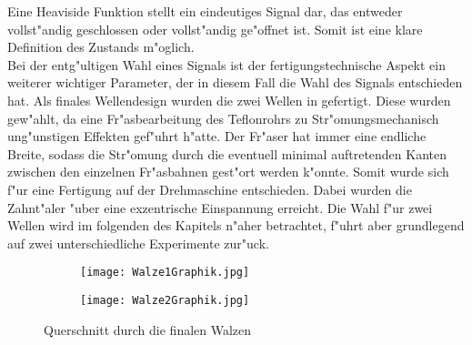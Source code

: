 Eine Heaviside Funktion stellt ein eindeutiges Signal dar, das entweder vollst"andig geschlossen oder vollst"andig ge"offnet ist. Somit ist eine klare Definition des Zustands m"oglich.\\
Bei der entg"ultigen Wahl eines Signals ist der fertigungstechnische Aspekt ein weiterer wichtiger Parameter, der in diesem Fall die Wahl des Signals entschieden hat. Als finales Wellendesign wurden die zwei Wellen in  gefertigt. Diese wurden gew"ahlt, da eine Fr"asbearbeitung des Teflonrohrs zu Str"omungsmechanisch ung"unstigen Effekten gef"uhrt h"atte. Der Fr"aser hat immer eine endliche Breite, sodass die Str"omung durch die eventuell minimal auftretenden Kanten zwischen den einzelnen Fr"asbahnen gest"ort werden k"onnte. Somit wurde sich f"ur eine Fertigung auf der Drehmaschine entschieden. Dabei wurden die Zahnt"aler "uber eine exzentrische Einspannung erreicht. Die Wahl f"ur zwei Wellen wird im folgenden des Kapitels n"aher betrachtet, f"uhrt aber grundlegend auf zwei unterschiedliche Experimente zur"uck.
\begin{figure}[h]
	\centering
	\begin{subfigure}[c]{0.4\textwidth}		
		\texttt{[image: Walze1Graphik.jpg]}
	\end{subfigure}
	\begin{subfigure}[c]{0.4\textwidth}
		\texttt{[image: Walze2Graphik.jpg]}
	\end{subfigure}
	\caption{Querschnitt durch die finalen Walzen}
	\label{fig:finalesdesign}
\end{figure}\\

